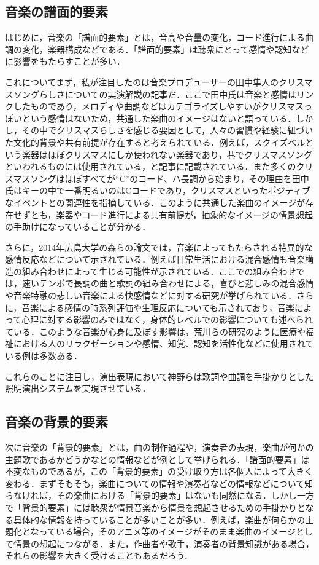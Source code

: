 \subsection{音楽の譜面的要素}
はじめに，音楽の「譜面的要素」とは，音高や音量の変化，コード進行による曲調の変化，楽器構成などである．「譜面的要素」は聴衆にとって感情や認知などに影響をもたらすことが多い．

これについてまず，私が注目したのは音楽プロデューサーの田中隼人のクリスマスソングらしさについての実演解説の記事だ\cite{xmassong}．ここで田中氏は音楽と感情はリンクしたものであり，メロディや曲調などはカテゴライズしやすいがクリスマスっぽいという感情はないため，共通した楽曲のイメージはないと語っている．しかし，その中でクリスマスらしさを感じる要因として，人々の習慣や経験に紐づいた文化的背景や共有前提が存在すると考えられている．例えば，スクイズベルという楽器はほぼクリスマスにしか使われない楽器であり，巷でクリスマスソングといわれるものには使用されている，と記事に記載されている．また多くのクリスマスソングはほぼすべてが“C”のコード、ハ長調から始まり，その理由を田中氏はキーの中で一番明るいのはCコードであり，クリスマスといったポジティブなイベントとの関連性を指摘している．このように共通した楽曲のイメージが存在せずとも，楽器やコード進行による共有前提が，抽象的なイメージの情景想起の手助けになっていることが分かる．

さらに，2014年広島大学の森らの論文では，音楽によってもたらされる特異的な感情反応などについて示されている\cite{Mori14}．例えば日常生活における混合感情も音楽構造の組み合わせによって生じる可能性が示されている．ここでの組み合わせでは，速いテンポで長調の曲と歌詞の組み合わせによる，喜びと悲しみの混合感情や音楽特融の悲しい音楽による快感情などに対する研究が挙げられている．さらに，音楽による感情の時系列評価や生理反応についても示されており，音楽によって心理に対する影響のみではなく，身体的レベルでの影響についても述べられている．このような音楽が心身に及ぼす影響は，荒川らの研究のように医療や福祉における人のリラクゼーションや感情、知覚、認知を活性化などに使用されている例は多数ある\cite{Arakawa96}．

これらのことに注目し，演出表現において神野らは歌詞や曲調を手掛かりとした照明演出システムを実現させている\cite{Kanno22}．
\subsection{音楽の背景的要素}
次に音楽の「背景的要素」とは，曲の制作過程や，演奏者の表現，楽曲が何かの主題歌であるかどうかなどの情報などが例として挙げられる．「譜面的要素」は不変なものであるが，この「背景的要素」の受け取り方は各個人によって大きく変わる．まずそもそも，楽曲についての情報や演奏者などの情報などについて知らなければ，その楽曲における「背景的要素」はないも同然になる．しかし一方で「背景的要素」には聴衆が情景音楽から情景を想起させるための手掛かりとなる具体的な情報を持っていることが多いことが多い．例えば，楽曲が何らかの主題化となっている場合，そのアニメ等のイメージがそのまま楽曲のイメージとして情景の想起につながる．また，作曲者や歌手，演奏者の背景知識がある場合，それらの影響を大きく受けることもあるだろう．
